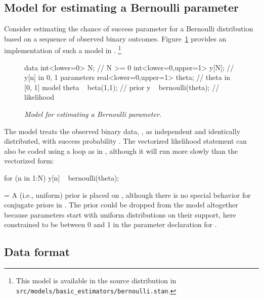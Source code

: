 \documentclass[article]{jss}
\newenvironment{absolutelynopagebreak}
  {\par\nobreak\vfil\penalty0\vfilneg
   \vtop\bgroup}
  {\par\xdef\tpd{\the\prevdepth}\egroup
   \prevdepth=\tpd}
\begin{document}
\subsection{Model for estimating a Bernoulli parameter}

Consider estimating the chance of success parameter for a Bernoulli
distribution based on a sequence of observed binary outcomes.  
Figure~\ref{bernoulli-model.fig} provides an implementation of such a
model in .%
%
\footnote{This model is available in the  source
  distribution in \nolinkurl{src/models/basic\_estimators/bernoulli.stan}.}
%
\begin{figure}
\begin{Code}
data {
  int<lower=0> N;                  // N >= 0
  int<lower=0,upper=1> y[N];       // y[n] in { 0, 1 }
}
parameters {
  real<lower=0,upper=1> theta;     // theta in [0, 1]
}
model {
  theta ~ beta(1,1);               // prior
  y ~ bernoulli(theta);            // likelihood
}
\end{Code}
\caption{\it Model for estimating a Bernoulli parameter.}\label{bernoulli-model.fig}
\end{figure}
%
The model treats the observed binary data, , as
independent and identically distributed, with success probability
.  The vectorized likelihood statement can also be coded
using a loop as in , although it will run more slowly than the
vectorized form:
%
\begin{absolutelynopagebreak}
\begin{Code}
for (n in 1:N)
  y[n] ~ bernoulli(theta);
\end{Code}
\end{absolutelynopagebreak}
%
A  (i.e., uniform) prior is placed on ,
although there is no special behavior for conjugate priors in
.  The prior could be dropped from the model altogether
because parameters start with uniform distributions on their support,
here constrained to be between 0 and 1 in the parameter declaration
for .  



\subsection{Data format}
\end{document}

